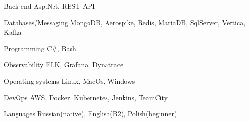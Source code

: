 

\begin{cvskills}

  \cvskill
    {Back-end} %
    {Asp.Net, REST API} %

  \cvskill
    {Databases/Messaging} %
    {MongoDB, Aerospike, Redis, MariaDB, SqlServer, Vertica, Kafka} %

  \cvskill
    {Programming} %
    {C\#, Bash} %

  \cvskill
    {Observability} %
    {ELK, Grafana, Dynatrace} %

  \cvskill
    {Operating systems} %
    {Linux, MacOs, Windows} %

  \cvskill
    {DevOps} %
    {AWS, Docker, Kubernetes, Jenkins, TeamCity} %

  \cvskill
    {Languages} %
    {Russian(native), English(B2), Polish(beginner)} %

\end{cvskills}
